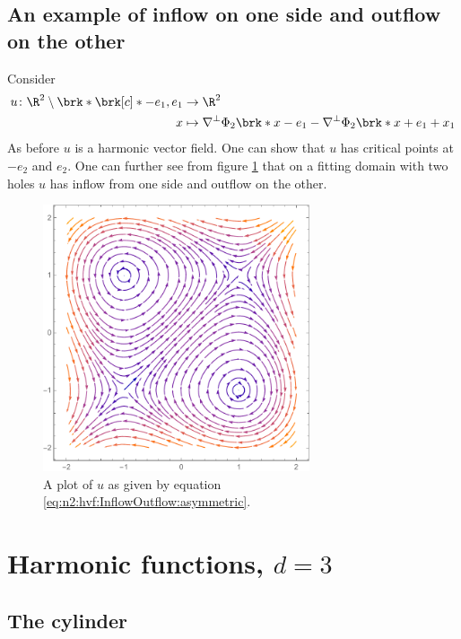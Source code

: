 \subsection{An example of inflow on one side and outflow on the other}
Consider
\begin{align*}
  u\colon\R^2\setminus\brk*{\brk[c]*{-e_1,e_1}}&\to\R^2 \\
  x&\mapsto\nabla^\perp\Phi_2\brk*{x-e_1}-\nabla^\perp\Phi_2\brk*{x+e_1}+x_1
\end{align*}
As before $u$ is a harmonic vector field. One can show that $u$ has critical points at $-e_2$ and
$e_2$. One can further see from figure \ref{pl:n2:hvf:InflowOutflow:asymmetric}
that on a fitting domain with two holes $u$ has inflow from one side and outflow on the other.

\begin{figure}
  \centering
  \includegraphics[width=0.7\textwidth]{../Plots/n2_hvf_InflowOutflow_asymmetric.pdf}
  \caption{A plot of $u$ as given by equation \eqref{eq:n2:hvf:InflowOutflow:asymmetric}.}
  \label{pl:n2:hvf:InflowOutflow:asymmetric}
\end{figure}


\newpage

\section{Harmonic functions, $d=3$}

\subsection{The cylinder}

